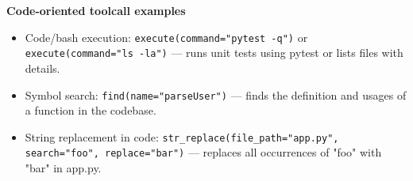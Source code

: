 \textbf{Code-oriented toolcall examples}
\begin{itemize}
  \item Code/bash execution: \texttt{execute(command="pytest -q")} or \texttt{execute(command="ls -la")} — runs unit tests using pytest or lists files with details.
  \item Symbol search: \texttt{find(name="parseUser")} — finds the definition and usages of a function in the codebase.
  \item String replacement in code: \texttt{str\_replace(file\_path="app.py", search="foo", replace="bar")} — replaces all occurrences of "foo" with "bar" in app.py.
\end{itemize}

